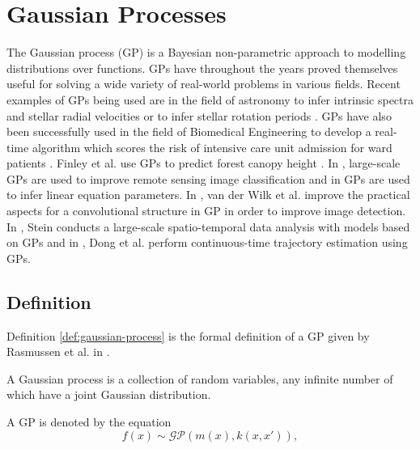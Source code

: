 \section{Gaussian Processes}
The Gaussian process \cite{Rasmussen2006} (GP) is a Bayesian non-parametric approach to modelling distributions over functions.
GPs have throughout the years proved themselves useful for solving a wide variety of real-world problems in various fields.
Recent examples of GPs being used are in the field of astronomy to infer intrinsic spectra and stellar radial velocities \cite{Czekala2017} or to infer stellar rotation periods \cite{Angus2017}.
GPs have also been successfully used in the field of Biomedical Engineering to develop a real-time algorithm which scores the risk of intensive care unit admission for ward patients \cite{Alaa2018}.
Finley et al. use GPs to predict forest canopy height \cite{Finley2017}.
In \cite{8082124}, large-scale GPs are used to improve remote sensing image classification and in \cite{Raissi2017} GPs are used to infer linear equation parameters.
In \cite{NIPS2017_6877}, van der Wilk et al. improve the practical aspects for a convolutional structure in GP in order to improve image detection.
In \cite{Stein2017}, Stein conducts a large-scale spatio-temporal data analysis with models based on GPs and in \cite{Dong2017}, Dong et al. perform continuous-time trajectory estimation using GPs.

\subsection{Definition}

Definition \ref{def:gaussian-process} is the formal definition of a GP given by Rasmussen et al. in \cite{Rasmussen2006}.
\begin{definition} \label{def:gaussian-process}
    A Gaussian process is a collection of random variables, any infinite number of which have a joint Gaussian distribution.
\end{definition}

A GP is denoted by the equation
\begin{equation} \label{eq:GP-eq1}
    f(x) \sim \mathcal{GP}(m(x), k(x, x')),
\end{equation}

